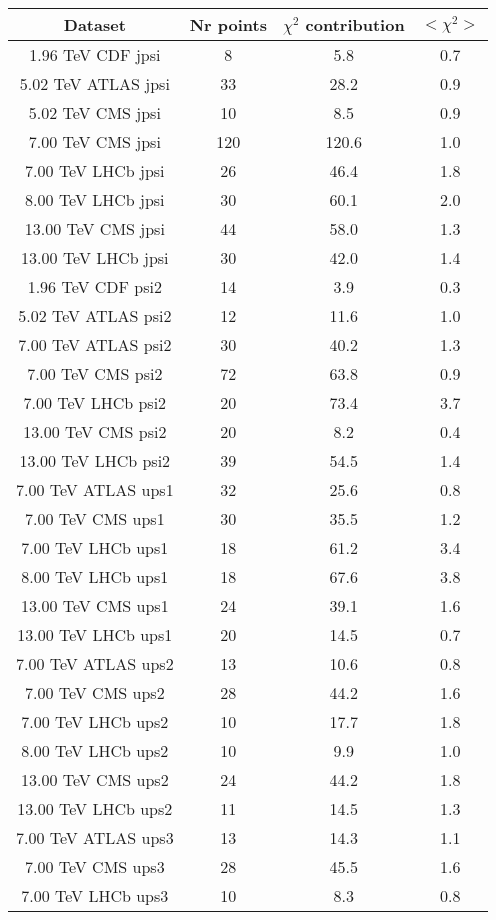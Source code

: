 \begin{table}[h!]
\centering
\begin{tabular}{c|c|c|c}
Dataset & Nr points & $\chi^2$ contribution & $<\chi^2>$ \\
\hline
1.96 TeV CDF jpsi & 8 & 5.8 & 0.7 \\
5.02 TeV ATLAS jpsi & 33 & 28.2 & 0.9 \\
5.02 TeV CMS jpsi & 10 & 8.5 & 0.9 \\
7.00 TeV CMS jpsi & 120 & 120.6 & 1.0 \\
7.00 TeV LHCb jpsi & 26 & 46.4 & 1.8 \\
8.00 TeV LHCb jpsi & 30 & 60.1 & 2.0 \\
13.00 TeV CMS jpsi & 44 & 58.0 & 1.3 \\
13.00 TeV LHCb jpsi & 30 & 42.0 & 1.4 \\
1.96 TeV CDF psi2 & 14 & 3.9 & 0.3 \\
5.02 TeV ATLAS psi2 & 12 & 11.6 & 1.0 \\
7.00 TeV ATLAS psi2 & 30 & 40.2 & 1.3 \\
7.00 TeV CMS psi2 & 72 & 63.8 & 0.9 \\
7.00 TeV LHCb psi2 & 20 & 73.4 & 3.7 \\
13.00 TeV CMS psi2 & 20 & 8.2 & 0.4 \\
13.00 TeV LHCb psi2 & 39 & 54.5 & 1.4 \\
7.00 TeV ATLAS ups1 & 32 & 25.6 & 0.8 \\
7.00 TeV CMS ups1 & 30 & 35.5 & 1.2 \\
7.00 TeV LHCb ups1 & 18 & 61.2 & 3.4 \\
8.00 TeV LHCb ups1 & 18 & 67.6 & 3.8 \\
13.00 TeV CMS ups1 & 24 & 39.1 & 1.6 \\
13.00 TeV LHCb ups1 & 20 & 14.5 & 0.7 \\
7.00 TeV ATLAS ups2 & 13 & 10.6 & 0.8 \\
7.00 TeV CMS ups2 & 28 & 44.2 & 1.6 \\
7.00 TeV LHCb ups2 & 10 & 17.7 & 1.8 \\
8.00 TeV LHCb ups2 & 10 & 9.9 & 1.0 \\
13.00 TeV CMS ups2 & 24 & 44.2 & 1.8 \\
13.00 TeV LHCb ups2 & 11 & 14.5 & 1.3 \\
7.00 TeV ATLAS ups3 & 13 & 14.3 & 1.1 \\
7.00 TeV CMS ups3 & 28 & 45.5 & 1.6 \\
7.00 TeV LHCb ups3 & 10 & 8.3 & 0.8 \\

\end{tabular}
\end{table}
